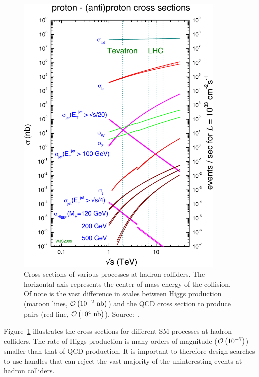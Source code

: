 \begin{figure}
  \centering
  \includegraphics[width=100mm,angle=00]{theory_chapter/figures/collider_crosssections.pdf}
  \caption[Cross sections of interest at hadron colliders]{Cross sections of
  various processes at hadron colliders.  The horizontal axis represents the
  center of mass energy of the collision.  Of note is the vast difference in
  scales between Higgs production (maroon lines, $\mbox{\ensuremath{\mathcal{O}\left(10^{-2}~\text{nb}\right)}}$) and the QCD
  cross section to produce \bbbar pairs (red line, $\mbox{\ensuremath{\mathcal{O}\left(10^4~\text{nb}\right)}}$).
  Source:~\cite{MSTWXSectionPlots}.} 
  \label{fig:HadronColliderCrossSections}
\end{figure}
Figure~\ref{fig:HadronColliderCrossSections} illustrates the cross sections for
different SM processes at hadron colliders.  The rate of Higgs production is
many orders of magnitude ($\mbox{\ensuremath{\mathcal{O}\left(10^{-7}\right)}}$) smaller than that of QCD production.  It
is important to therefore design searches to use handles that can reject the
vast majority of the uninteresting events at hadron colliders.  

